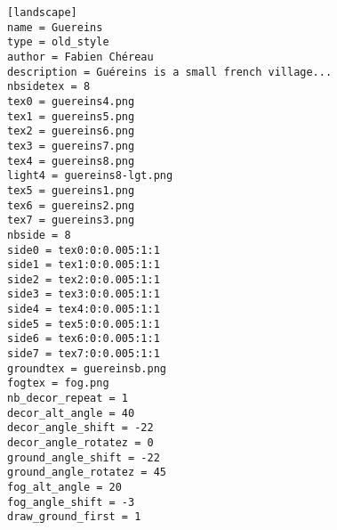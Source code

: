 \begin{config}
\texttt{{[}landscape{]}}\\
\texttt{name~=~Guereins}\\
\texttt{type~=~old\_style}\\
\texttt{author~=~Fabien~Chéreau}\\
\texttt{description~=~Guéreins~is~a~small~french~village...}\\
\texttt{nbsidetex~=~8}\\
\texttt{tex0~=~guereins4.png}\\
\texttt{tex1~=~guereins5.png}\\
\texttt{tex2~=~guereins6.png}\\
\texttt{tex3~=~guereins7.png}\\
\texttt{tex4~=~guereins8.png}\\
\texttt{light4~=~guereins8-lgt.png}\\
\texttt{tex5~=~guereins1.png}\\
\texttt{tex6~=~guereins2.png}\\
\texttt{tex7~=~guereins3.png}\\
\texttt{nbside~=~8}\\
\texttt{side0~=~tex0:0:0.005:1:1}\\
\texttt{side1~=~tex1:0:0.005:1:1}\\
\texttt{side2~=~tex2:0:0.005:1:1}\\
\texttt{side3~=~tex3:0:0.005:1:1}\\
\texttt{side4~=~tex4:0:0.005:1:1}\\
\texttt{side5~=~tex5:0:0.005:1:1}\\
\texttt{side6~=~tex6:0:0.005:1:1}\\
\texttt{side7~=~tex7:0:0.005:1:1}\\
\texttt{groundtex~=~guereinsb.png}\\
\texttt{fogtex~=~fog.png}\\
\texttt{nb\_decor\_repeat~=~1}\\
\texttt{decor\_alt\_angle~=~40}\\
\texttt{decor\_angle\_shift~=~-22}\\
\texttt{decor\_angle\_rotatez~=~0}\\
\texttt{ground\_angle\_shift~=~-22}\\
\texttt{ground\_angle\_rotatez~=~45}\\
\texttt{fog\_alt\_angle~=~20}\\
\texttt{fog\_angle\_shift~=~-3}\\
\texttt{draw\_ground\_first~=~1}
\end{config}

